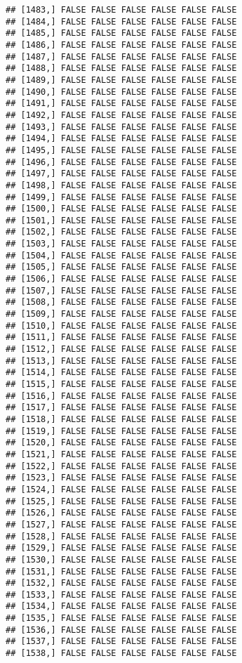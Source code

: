 \documentclass[
]{article}
\begin{document}
\begin{verbatim}
## [1483,] FALSE FALSE FALSE FALSE FALSE FALSE
## [1484,] FALSE FALSE FALSE FALSE FALSE FALSE
## [1485,] FALSE FALSE FALSE FALSE FALSE FALSE
## [1486,] FALSE FALSE FALSE FALSE FALSE FALSE
## [1487,] FALSE FALSE FALSE FALSE FALSE FALSE
## [1488,] FALSE FALSE FALSE FALSE FALSE FALSE
## [1489,] FALSE FALSE FALSE FALSE FALSE FALSE
## [1490,] FALSE FALSE FALSE FALSE FALSE FALSE
## [1491,] FALSE FALSE FALSE FALSE FALSE FALSE
## [1492,] FALSE FALSE FALSE FALSE FALSE FALSE
## [1493,] FALSE FALSE FALSE FALSE FALSE FALSE
## [1494,] FALSE FALSE FALSE FALSE FALSE FALSE
## [1495,] FALSE FALSE FALSE FALSE FALSE FALSE
## [1496,] FALSE FALSE FALSE FALSE FALSE FALSE
## [1497,] FALSE FALSE FALSE FALSE FALSE FALSE
## [1498,] FALSE FALSE FALSE FALSE FALSE FALSE
## [1499,] FALSE FALSE FALSE FALSE FALSE FALSE
## [1500,] FALSE FALSE FALSE FALSE FALSE FALSE
## [1501,] FALSE FALSE FALSE FALSE FALSE FALSE
## [1502,] FALSE FALSE FALSE FALSE FALSE FALSE
## [1503,] FALSE FALSE FALSE FALSE FALSE FALSE
## [1504,] FALSE FALSE FALSE FALSE FALSE FALSE
## [1505,] FALSE FALSE FALSE FALSE FALSE FALSE
## [1506,] FALSE FALSE FALSE FALSE FALSE FALSE
## [1507,] FALSE FALSE FALSE FALSE FALSE FALSE
## [1508,] FALSE FALSE FALSE FALSE FALSE FALSE
## [1509,] FALSE FALSE FALSE FALSE FALSE FALSE
## [1510,] FALSE FALSE FALSE FALSE FALSE FALSE
## [1511,] FALSE FALSE FALSE FALSE FALSE FALSE
## [1512,] FALSE FALSE FALSE FALSE FALSE FALSE
## [1513,] FALSE FALSE FALSE FALSE FALSE FALSE
## [1514,] FALSE FALSE FALSE FALSE FALSE FALSE
## [1515,] FALSE FALSE FALSE FALSE FALSE FALSE
## [1516,] FALSE FALSE FALSE FALSE FALSE FALSE
## [1517,] FALSE FALSE FALSE FALSE FALSE FALSE
## [1518,] FALSE FALSE FALSE FALSE FALSE FALSE
## [1519,] FALSE FALSE FALSE FALSE FALSE FALSE
## [1520,] FALSE FALSE FALSE FALSE FALSE FALSE
## [1521,] FALSE FALSE FALSE FALSE FALSE FALSE
## [1522,] FALSE FALSE FALSE FALSE FALSE FALSE
## [1523,] FALSE FALSE FALSE FALSE FALSE FALSE
## [1524,] FALSE FALSE FALSE FALSE FALSE FALSE
## [1525,] FALSE FALSE FALSE FALSE FALSE FALSE
## [1526,] FALSE FALSE FALSE FALSE FALSE FALSE
## [1527,] FALSE FALSE FALSE FALSE FALSE FALSE
## [1528,] FALSE FALSE FALSE FALSE FALSE FALSE
## [1529,] FALSE FALSE FALSE FALSE FALSE FALSE
## [1530,] FALSE FALSE FALSE FALSE FALSE FALSE
## [1531,] FALSE FALSE FALSE FALSE FALSE FALSE
## [1532,] FALSE FALSE FALSE FALSE FALSE FALSE
## [1533,] FALSE FALSE FALSE FALSE FALSE FALSE
## [1534,] FALSE FALSE FALSE FALSE FALSE FALSE
## [1535,] FALSE FALSE FALSE FALSE FALSE FALSE
## [1536,] FALSE FALSE FALSE FALSE FALSE FALSE
## [1537,] FALSE FALSE FALSE FALSE FALSE FALSE
## [1538,] FALSE FALSE FALSE FALSE FALSE FALSE

\end{verbatim}
\end{document}
